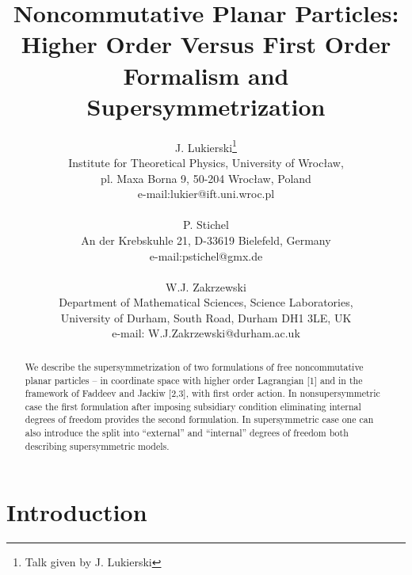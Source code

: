 \documentclass[a4paper,12pt]{article}
\begin{document}
\title{Noncommutative Planar Particles: Higher Order Versus First
  Order Formalism  and Supersymmetrization}


\author{J. Lukierski\footnote{Talk given by J. Lukierski} 
\\ 
Institute for Theoretical Physics, University of Wroc{\l}aw,
 \\
   pl. Maxa Borna 9, 50-204 Wroc{\l}aw, Poland
  \\
  e-mail:lukier@ift.uni.wroc.pl
\\ \\
P. Stichel
\\
An der Krebskuhle 21, D-33619 Bielefeld, Germany   
 \\
 e-mail:pstichel@gmx.de
 \\ \\
W.J. Zakrzewski
 \\
Department of Mathematical Sciences,
 Science Laboratories,   \\
University of Durham, South Road,
Durham DH1 3LE, UK   
 \\
 e-mail: W.J.Zakrzewski@durham.ac.uk
}

\date{}
\maketitle

\begin{abstract}

We describe the supersymmetrization of two formulations of free
noncommutative planar particles -- in coordinate space with
 higher order Lagrangian [1] and in the framework of
 Faddeev and Jackiw [2,3], with first order action.
 In nonsupersymmetric case the first formulation after imposing 
subsidiary
  condition    eliminating internal degrees of freedom
   provides the second formulation. In supersymmetric case
 one can also introduce the split into ``external'' and ``internal''
  degrees of freedom both describing supersymmetric models.

\end{abstract}


\section{Introduction}
\end{document}
